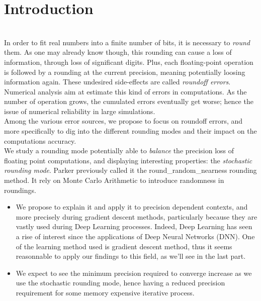 \documentclass[a4paper,11pt]{article}
\let\cite=\supercite
\begin{document}
\section{Introduction}
\begin{sloppypar} \hspace{0pt} \\
\indent In order to fit real numbers into a finite number of bits, it is necessary to \emph{round} them. As one may already know though, this rounding can cause a loss of information, through loss of significant digits. Plus, each floating-point operation is followed by a rounding at the current precision, meaning potentially loosing information again. These undesired side-effects are called \emph{roundoff errors}\cite{kaneko1973local}. Numerical analysis aim at estimate this kind of errors in computations\cite{Hazewinkel1994}. As the number of operation grows, the cumulated errors eventually get worse; hence the issue of numerical reliability in large simulations. \\
\indent Among the various error sources, we propose to focus on roundoff errors, and more specifically to dig into the different rounding modes and their impact on the computations accuracy.\\
\indent We study a rounding mode potentially able to \emph{balance} the precision loss of floating point computations, and displaying interesting properties: the \emph{stochastic rounding mode}. Parker previously called it the {\ttfamily round\_random\_nearness}\cite{Parker1997} rounding method. It rely on Monte Carlo Arithmetic to introduce randomness in roundings. %
\end{sloppypar}
\begin{itemize}
  \item We propose to explain it and apply it to precision dependent contexts, and more precisely during gradient descent methods, particularly because they are vastly used during Deep Learning processes. Indeed, Deep Learning has seen a rise of interest since the applications of Deep Neural Networks (DNN). One of the learning method used is gradient descent method, thus it seems reasonnable to apply our findings to this field, as we'll see in the last part. %
  \item We expect to see the minimum precision required to converge increase as we use the stochastic rounding mode, hence having a reduced precision requirement for some memory expensive iterative process. %
\end{itemize}
\end{document}
